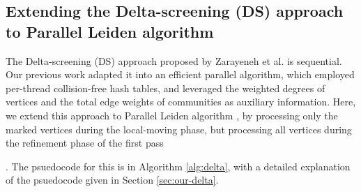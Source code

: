 




\subsection{Extending the Delta-screening (DS) approach to Parallel Leiden algorithm}

The Delta-screening (DS) approach proposed by Zarayeneh et al. \cite{com-zarayeneh21} is sequential. Our previous work \cite{sahu2024dflouvain} adapted it into an efficient parallel algorithm, which employed per-thread collision-free hash tables, and leveraged the weighted degrees of vertices and the total edge weights of communities as auxiliary information. Here, we extend this approach to Parallel Leiden algorithm \cite{sahu2023gveleiden}, by processing only the marked vertices during the local-moving phase, but processing all vertices during the refinement phase of the first pass. The psuedocode for this is in Algorithm \ref{alg:delta}, with a detailed explanation of the psuedocode given in Section \ref{sec:our-delta}.





